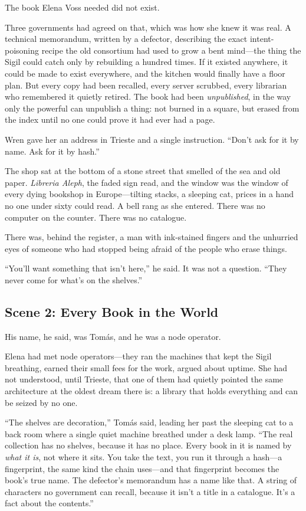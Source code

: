 \documentclass[12pt,letterpaper]{book}
\begin{document}
The book Elena Voss needed did not exist.

Three governments had agreed on that, which was how she knew it was real. A
technical memorandum, written by a defector, describing the exact intent-poisoning
recipe the old consortium had used to grow a bent mind---the thing the Sigil could
catch only by rebuilding a hundred times. If it existed anywhere, it could be made
to exist everywhere, and the kitchen would finally have a floor plan. But every
copy had been recalled, every server scrubbed, every librarian who remembered it
quietly retired. The book had been \emph{unpublished}, in the way only the powerful
can unpublish a thing: not burned in a square, but erased from the index until no
one could prove it had ever had a page.

Wren gave her an address in Trieste and a single instruction. ``Don't ask for it
by name. Ask for it by hash.''

The shop sat at the bottom of a stone street that smelled of the sea and old paper.
\emph{Libreria Aleph}, the faded sign read, and the window was the window of every
dying bookshop in Europe---tilting stacks, a sleeping cat, prices in a hand no one
under sixty could read. A bell rang as she entered. There was no computer on the
counter. There was no catalogue.

There was, behind the register, a man with ink-stained fingers and the unhurried
eyes of someone who had stopped being afraid of the people who erase things.

``You'll want something that isn't here,'' he said. It was not a question. ``They
never come for what's on the shelves.''

\hypertarget{scene-2-every-book-in-the-world}{%
\subsection{Scene 2: Every Book in the
World}\label{scene-2-every-book-in-the-world}}

His name, he said, was Tomás, and he was a node operator.

Elena had met node operators---they ran the machines that kept the Sigil
breathing, earned their small fees for the work, argued about uptime. She had not
understood, until Trieste, that one of them had quietly pointed the same
architecture at the oldest dream there is: a library that holds everything and can
be seized by no one.

``The shelves are decoration,'' Tomás said, leading her past the sleeping cat to a
back room where a single quiet machine breathed under a desk lamp. ``The real
collection has no shelves, because it has no place. Every book in it is named by
\emph{what it is}, not where it sits. You take the text, you run it through a
hash---a fingerprint, the same kind the chain uses---and that fingerprint becomes
the book's true name. The defector's memorandum has a name like that. A string of
characters no government can recall, because it isn't a title in a catalogue. It's
a fact about the contents.''
\end{document}
